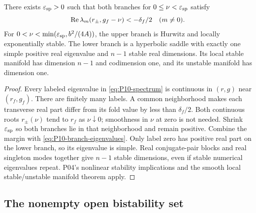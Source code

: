 \begin{corollary}
\label{cor:P10-near-stability}
There exists $\varepsilon_{\rm sp}>0$ such that both branches for
$0\le\nu<\varepsilon_{\rm sp}$ satisfy
\[
 \operatorname{Re}\lambda_m(r_\pm,g_f-\nu)<-\delta_f/2\quad(m\ne0).
\]
For $0<\nu<\min(\varepsilon_{\rm sp},b^2/(4A))$, the upper
branch is Hurwitz and locally exponentially stable. The lower branch
is a hyperbolic saddle with exactly one simple positive real eigenvalue
and $n-1$ stable real dimensions. Its local stable manifold has dimension
$n-1$ and codimension one, and its unstable manifold has dimension one.
\end{corollary}
\begin{proof}
Every labeled eigenvalue in \eqref{eq:P10-spectrum} is continuous
in $(r,g)$ near $(r_f,g_f)$. There are finitely many labels.
A common neighborhood makes each transverse real part differ from
its fold value by less than $\delta_f/2$. Both continuous roots
$r_\pm(\nu)$ tend to $r_f$ as $\nu\downarrow0$; smoothness in
$\nu$ at zero is not needed. Shrink $\varepsilon_{\rm sp}$ so both
branches lie in that neighborhood and remain positive. Combine the
margin with \eqref{eq:P10-branch-eigenvalues}. Only label zero has
positive real part on the lower branch, so its eigenvalue is simple.
Real conjugate-pair blocks and real singleton modes together give
$n-1$ stable dimensions, even if stable numerical eigenvalues repeat.
P04's nonlinear stability implications and the smooth local
stable/unstable manifold theorem apply.
\end{proof}

\subsection{The nonempty open bistability set}
\label{slot:P10-3}

